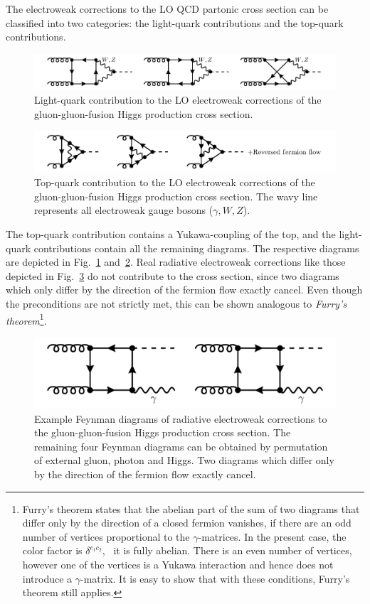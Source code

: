 The electroweak corrections to the \acs{LO} \acs{QCD} partonic cross section can be classified into two categories: the light-quark contributions and the top-quark contributions.
\begin{figure}[ht]
  \centering
  \includegraphics[width=\textwidth]{Images/electro_weak_light.pdf}
  \caption{Light-quark contribution to the \acs{LO} electroweak corrections of the gluon-gluon-fusion Higgs production cross section.}
  \label{fig:4:ew_lq}
\end{figure}
\begin{figure}[ht]
  \centering
  \includegraphics[width=\textwidth]{Images/electro_weak_top.pdf}
  \caption{Top-quark contribution to the \acs{LO} electroweak corrections of the gluon-gluon-fusion Higgs production cross section. The wavy line represents all electroweak gauge bosons ($\gamma, W, Z$).}
  \label{fig:4:ew_top}
\end{figure}
The top-quark contribution contains a Yukawa-coupling of the top, and the light-quark contributions contain all the remaining diagrams. The respective diagrams are depicted in Fig.~\ref{fig:4:ew_lq} and\ \ref{fig:4:ew_top}. Real radiative electroweak corrections like those depicted in Fig.~\ref{fig:4:ew_real} do not contribute to the cross section, since two diagrams which only differ by the direction of the fermion flow exactly cancel. Even though the preconditions are not strictly met, this can be shown analogous to \textit{Furry's theorem}\footnote{Furry's theorem states that the abelian part of the sum of two diagrams that differ only by the direction of a closed fermion vanishes, if there are an odd number of vertices proportional to the $\gamma$-matrices. In the present case, the color factor is $\delta^{c_1 c_2}$, \ie\ it is fully abelian. There is an even number of vertices, however one of the vertices is a Yukawa interaction and hence does not introduce a $\gamma$-matrix. It is easy to show that with these conditions, Furry's theorem still applies.}.
\begin{figure}[ht]
  \centering
  \includegraphics[scale=0.32]{Images/electro_weak_real.pdf}
  \caption{Example Feynman diagrams of radiative electroweak corrections to the gluon-gluon-fusion Higgs production cross section. The remaining four Feynman diagrams can be obtained by permutation of external gluon, photon and Higgs. Two diagrams which differ only by the direction of the fermion flow exactly cancel.}
  \label{fig:4:ew_real}
\end{figure}

